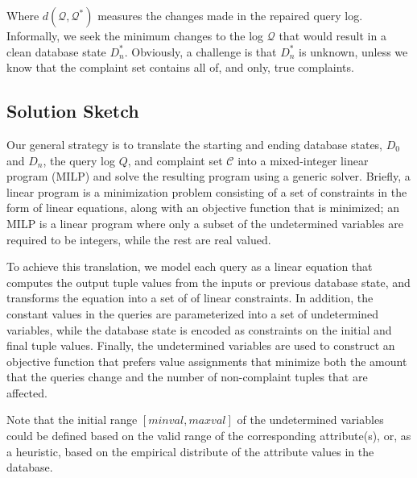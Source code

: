 Where $d(\mathcal{Q}, \mathcal{Q}^*)$ measures the changes made in the repaired query log.
Informally, we seek the minimum changes to the log $\mathcal{Q}$
that would result in a clean database state $D_n^*$. Obviously, a
challenge is that $D_n^*$ is unknown, unless we know that the
complaint set contains all of, and only, true complaints.  


\subsection{Solution Sketch}

Our general strategy is to translate the starting
and ending database states, $D_0$ and $D_n$, the query log $Q$, and
complaint set $\mathcal{C}$ into a mixed-integer linear program (MILP)
and solve the resulting program using a generic solver.  
Briefly, a linear program is a minimization problem consisting of
a set of constraints in the form of linear equations, along with
an objective function that is minimized; an MILP is a linear program
where only a subset of the undetermined variables are required to
be integers, while the rest are real valued.  

\iffalse
For example, in the following
example, $b$ and $z$ are undetermined integer and real valued variables, respectively,
whereas $x$ is determined to be $1$.  The objective function is $b+z$, 
resulting in the optimal solution $b = z = 1$.

\[
\begin{array}{l l l}
minimize      & b + z\\
\mbox{s.t.}   &x &= b * z \\
              &x &= 1\\
              &b &\in \{0, 1, 2, 3\}\\
              &z &\le 6\\
              &z &\ge 0\\
\end{array}
\]
\fi

To achieve this translation,
we model each query as a linear equation that computes the output
tuple values from the inputs or previous database state,
and transforms the equation into a
set of of linear constraints. In addition, the constant values in
the queries are parameterized into a set of undetermined variables,
while the database state is encoded as constraints on the initial
and final tuple values. Finally, the undetermined variables are
used to construct an objective function that prefers value assignments
that minimize both the amount that the queries change and the number
of non-complaint tuples that are affected.

Note that the initial range $[minval, maxval]$ of the 
undetermined variables could be defined based on
the valid range of the corresponding attribute(s), or, as a heuristic,
based on the empirical distribute of the attribute values in the database. 

